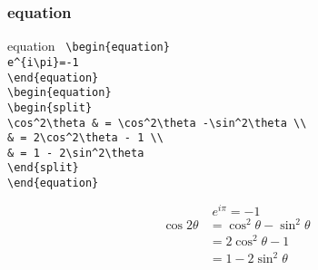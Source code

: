 \subsubsection{equation}
\begin{itembox}[c]{equation}
  \texttt{
    \hspace{-0.5\zw}\textbackslash begin\{equation\}\\
    \hspace{2\zw}e\textasciicircum\{i\textbackslash pi\}=-1\\
    \textbackslash end\{equation\}\\
    \textbackslash begin\{equation\}\\
    \hspace{2\zw}\textbackslash begin\{split\}\\
    \hspace{4\zw}\textbackslash cos\textasciicircum2\textbackslash theta \& = \textbackslash cos\textasciicircum2\textbackslash theta -\textbackslash sin\textasciicircum2\textbackslash theta \textbackslash \textbackslash\\
    \hspace{4\zw}\& = 2\textbackslash cos\textasciicircum2\textbackslash theta - 1          \textbackslash \textbackslash\\
    \hspace{4\zw}\& = 1 - 2\textbackslash sin\textasciicircum2\textbackslash theta\\
    \hspace{2\zw}\textbackslash end\{split\}\\
    \textbackslash end\{equation\}\\
  }
\end{itembox}
\begin{equation}
  e^{i\pi}=-1
\end{equation}
\begin{equation}
  \begin{split}
    \cos 2\theta & = \cos^2\theta -\sin^2\theta \\
                 & = 2\cos^2\theta - 1          \\
                 & = 1 - 2\sin^2\theta
  \end{split}
\end{equation}
